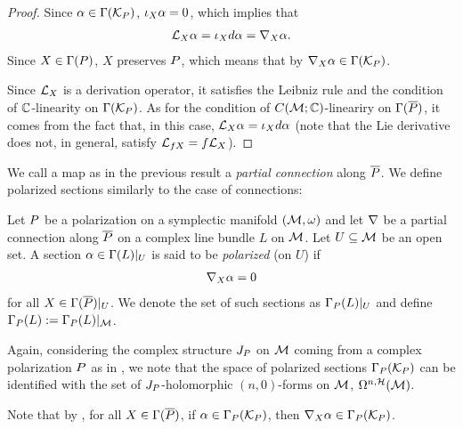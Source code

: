 \documentclass[notas.tex]{subfiles}
\begin{document}
\begin{proof}
	Since $\alpha \in \Gamma(\mathcal{K}_P)$, $\iota_{X}\alpha = 0$, which implies that
	\begin{align*}
		\mathcal{L}_{X} \alpha = \iota_{X}d \alpha = \nabla_{X}\alpha.
	\end{align*}
	Since $X \in \Gamma(P)$, $X$ preserves $P$, which means that by  $\nabla_{X}\alpha \in \Gamma(\mathcal{K}_P)$.

	Since $\mathcal{L}_{X}$ is a derivation operator, it satisfies the Leibniz rule and the condition of $\mathbb{C}$-linearity on $\Gamma(\mathcal{K}_P)$. As for the condition of $C(\mathcal{M}; \mathbb{C})$-lineariry on $\Gamma(\overline {P})$, it comes from the fact that, in this case, $\mathcal{L}_{X} \alpha = \iota_{X}d \alpha$ (note that the Lie derivative does not, in general, satisfy $\mathcal{L}_{fX} = f\mathcal{L}_{X}$).
\end{proof}
We call a map as in the previous result a \emph{partial connection} along $\overline {P}$. We define polarized sections similarly to the case of connections:
\begin{defn}
	Let $P$ be a polarization on a symplectic manifold $(\mathcal{M}, \omega)$ and let $\nabla$ be a partial connection along $\overline {P}$ on a complex line bundle $L$ on $\mathcal{M}$. Let $U \subseteq \mathcal{M}$ be an open set. A section $\alpha \in \Gamma(L)|_U$ is said to be \emph{polarized} (on $U$) if
	\begin{align} \label{eq_cbund_psec}
		\nabla_{X} \alpha = 0
	\end{align}
	for all $X \in \Gamma(\overline {P})|_U$. We denote the set of such sections as $\Gamma_P(L)|_U$ and define $\Gamma_P(L) := \Gamma_P(L)|_{\mathcal{M}}$.
\end{defn}

\begin{rem}
	Again, considering the complex structure $J_P$ on $\mathcal{M}$ coming from a complex polarization $P$ as in , we note that the space of polarized sections $\Gamma_P(\mathcal{K}_P)$ can be identified with the set of $J_P$-holomorphic $(n,0)$-forms on $\mathcal{M}$, $\Omega^{n, \mathcal{H}}(\mathcal{M})$.
\end{rem}

Note that by , for all $X \in \Gamma(\overline {P})$, if $\alpha \in \Gamma_P(\mathcal{K}_P)$, then $\nabla_{X}\alpha \in \Gamma_P(\mathcal{K}_P)$.

\end{document}
